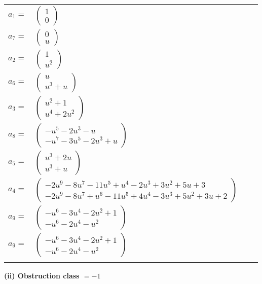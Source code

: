 \documentclass[1p]{elsarticle_modified}
\theoremstyle{definition}
\begin{document}
\begin{tabular}{m{7pt} m{180pt} m{7pt} m{180pt} }
\flushright $a_{1}=$&$\begin{pmatrix}1\\0\end{pmatrix}$ \\
\flushright $a_{7}=$&$\begin{pmatrix}0\\u\end{pmatrix}$ \\
\flushright $a_{2}=$&$\begin{pmatrix}1\\u^2\end{pmatrix}$ \\
\flushright $a_{6}=$&$\begin{pmatrix}u\\u^3+u\end{pmatrix}$ \\
\flushright $a_{3}=$&$\begin{pmatrix}u^2+1\\u^4+2 u^2\end{pmatrix}$ \\
\flushright $a_{8}=$&$\begin{pmatrix}- u^5-2 u^3- u\\- u^7-3 u^5-2 u^3+u\end{pmatrix}$ \\
\flushright $a_{5}=$&$\begin{pmatrix}u^3+2 u\\u^3+u\end{pmatrix}$ \\
\flushright $a_{4}=$&$\begin{pmatrix}-2 u^9-8 u^7-11 u^5+u^4-2 u^3+3 u^2+5 u+3\\-2 u^9-8 u^7+u^6-11 u^5+4 u^4-3 u^3+5 u^2+3 u+2\end{pmatrix}$ \\
\flushright $a_{9}=$&$\begin{pmatrix}- u^6-3 u^4-2 u^2+1\\- u^6-2 u^4- u^2\end{pmatrix}$\\ \flushright $a_{9}=$&$\begin{pmatrix}- u^6-3 u^4-2 u^2+1\\- u^6-2 u^4- u^2\end{pmatrix}$\\&\end{tabular}
\flushleft \textbf{(ii) Obstruction class $= -1$}\\~\\
\end{document}
